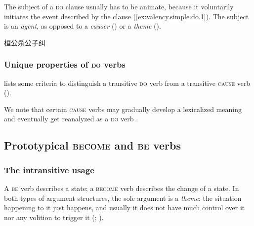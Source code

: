 \documentclass[UTF8, a4paper, oneside, scheme=plain, 12pt]{ctexrep}
\newcommand*{\citepage}[1]{p.~{#1}}
\newcommand*{\citepages}[1]{pp.~{#1}}
\newcommand*{\term}[1]{\emph{#1}}
\newcommand*{\category}[1]{\textsc{#1}}
\begin{document}
The subject of a \category{do} clause usually has to be animate,
because it voluntarily initiates the event described by the clause
(\ref{ex:valency.simple.do.1}).
The subject is an \term{agent}, as opposed to a \term{causer} ()
or a \term{theme} ().

\begin{exe}
    \ex\label{ex:valency.simple.do.1} 桓公杀公子纠
\end{exe}

\subsubsection{Unique properties of \category{do} verbs}\label{sec:valency.simple.do.properties}

\citet[\citepage{272}]{meiguang2018} lists some criteria
to distinguish a transitive \category{do} verb 
from a transitive \category{cause} verb
().

We note that certain \category{cause} verbs may gradually develop a lexicalized meaning
and eventually get reanalyzed as a \category{do} verb
\citep[\citepages{269-271}]{meiguang2018}.

\subsection{Prototypical \category{become} and \category{be} verbs}
\label{sec:valency.simple.state-and-change}

\subsubsection{The intransitive usage}

A \category{be} verb describes a state;
a \category{become} verb describes the change of a state.
In both types of argument structures,
the sole argument is a \term{theme}:
the situation happening to it just happens,
and usually it does not have much control over it nor any volition to trigger it
(\citealt[\citepage{345}]{li2004grammar}; \citealt[\citepage{275}]{meiguang2018}).
\end{document}
